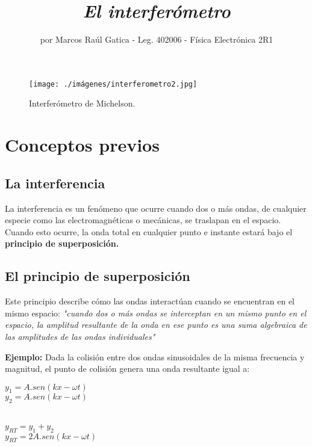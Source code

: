 \documentclass[a4paper, 12pt]{article}
\title{\textbf{\textit{El interferómetro}}}
\author{por Marcos Raúl Gatica - Leg. 402006 - Física Electrónica 2R1}
\date{}
\begin{document}
	\thispagestyle{fancy}
	\maketitle
	\thispagestyle{empty}
	\begin{figure}[h!]
		\centering
		\texttt{[image: ./imágenes/interferometro2.jpg]}
		\caption{Interferómetro de Michelson.}
		\label{fig:interferometro}
	\end{figure}
	
	\newpage
	
	\setcounter{page}{1}
	\tableofcontents

	\newpage
	
	\section{\textbf{Conceptos previos}}
	
	\subsection{La interferencia}
	\indent La interferencia es un fenómeno que ocurre cuando dos o más ondas, de cualquier especie como las electromagnéticas o mecánicas, se traslapan en el espacio. Cuando esto ocurre, la onda total en cualquier punto e instante estará bajo el \textbf{principio de superposición.}
	
	\subsection{El principio de superposición}
	\indent Este principio describe cómo las ondas interactúan cuando se encuentran en el mismo espacio: \textit{"cuando dos o más ondas se interceptan en un mismo punto en el espacio, la amplitud resultante de la onda en ese punto es una suma algebraica de las amplitudes de las ondas individuales"}
	
	\textbf{Ejemplo:} \newline
	\indent Dada la colisión entre dos ondas sinusoidales de la misma frecuencia y magnitud, el punto de colisión genera una onda resultante igual a:
	
	\begin{center}
		${y_1} = A.sen(kx - \omega t)$ \\ 
		${y_2} = A.sen(kx - \omega t)$ \\ \
		
		${y_{RT}} = {y_1} + {y_2}$ \\
		${y_{RT}} = 2A.sen(kx - \omega t)$ \\
	\end{center}
	
\end{document}
